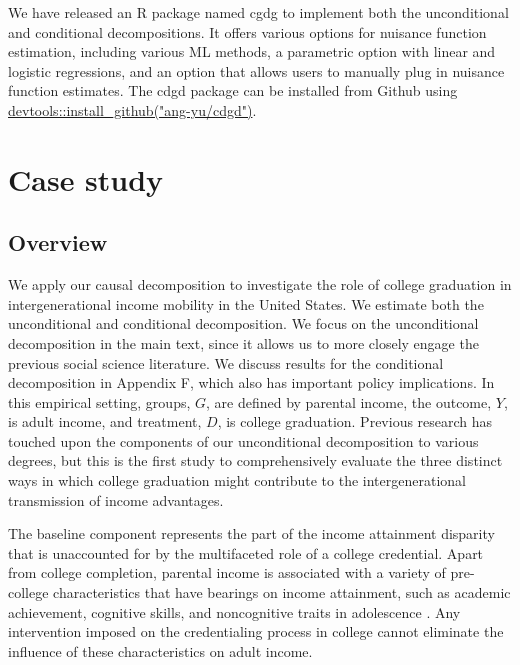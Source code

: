\documentclass[12pt,a4paper]{article}
\begin{document}
We have released an R package named cgdg to implement both the unconditional and conditional decompositions. It offers various options for nuisance function estimation, including various ML methods, a parametric option with linear and logistic regressions, and an option that allows users to manually plug in nuisance function estimates. The cdgd package can be installed from Github using \url{devtools::install_github("ang-yu/cdgd")}.


\section{Case study}
\subsection{Overview}
We apply our causal decomposition to investigate the role of college graduation in intergenerational income mobility in the United States. We estimate both the unconditional and conditional decomposition. We focus on the unconditional decomposition in the main text, since it allows us to more closely engage the previous social science literature. We discuss results for the conditional decomposition in Appendix F, which also has important policy implications. In this empirical setting, groups, $G$, are defined by parental income, the outcome, $Y$, is adult income, and treatment, $D$, is college graduation. 
Previous research has touched upon the components of our unconditional decomposition to various degrees, but this is the first study to comprehensively evaluate the three distinct ways in which college graduation might contribute to the intergenerational transmission of income advantages. 

The baseline component represents the part of the income attainment disparity that is unaccounted for by the multifaceted role of a college credential. Apart from college completion, parental income is associated with a variety of pre-college characteristics that have bearings on income attainment, such as academic achievement, cognitive skills, and noncognitive traits in adolescence \citep{reardon_widening_2011, heckman_effects_2006, farkas_cognitive_2003}. Any intervention imposed on the credentialing process in college cannot eliminate the influence of these characteristics on adult income.

\end{document}

